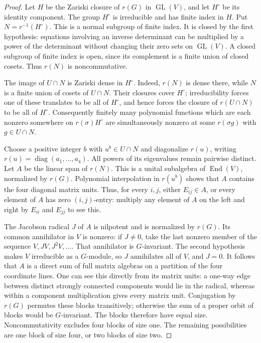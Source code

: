\documentclass[11pt,a4paper]{article}
\theoremstyle{remark}
\begin{document}
\begin{proof}
Let $H$ be the Zariski closure of $r(G)$ in $\operatorname{GL}(V)$,
and let $H^\circ$ be its identity component. The group $H^\circ$ is
irreducible and has finite index in $H$. Put
$N=r^{-1}(H^\circ)$. This is a normal subgroup of finite index.
It is closed by the first hypothesis: equations involving an inverse
determinant can be multiplied by a power of the determinant without
changing their zero sets on $\operatorname{GL}(V)$. A closed subgroup
of finite index is open, since its complement is a finite union of
closed cosets. Thus $r(N)$ is noncommutative.

The image of $U\cap N$ is Zariski dense in $H^\circ$.
Indeed, $r(N)$ is dense there, while $N$ is a finite union of cosets
of $U\cap N$. Their closures cover $H^\circ$; irreducibility forces
one of these translates to be all of $H^\circ$, and hence forces
the closure of $r(U\cap N)$ to be all of $H^\circ$.
Consequently finitely many polynomial functions which are each
nonzero somewhere on $r(\sigma)H^\circ$ are simultaneously nonzero
at some $r(\sigma g)$ with $g\in U\cap N$.

Choose a positive integer $b$ with $u^b\in U\cap N$ and diagonalize
$r(u)$, writing $r(u)=\operatorname{diag}(a_1,\ldots,a_4)$.
All powers of its eigenvalues remain pairwise distinct.
Let $A$ be the linear span of $r(N)$. This is a unital subalgebra of
$\operatorname{End}(V)$, normalized by $r(G)$. Polynomial interpolation
in $r(u^b)$ shows that $A$ contains the four diagonal matrix units.
Thus, for every $i,j$, either $E_{ij}\in A$, or every element of $A$
has zero $(i,j)$-entry: multiply any element of $A$ on the left and
right by $E_{ii}$ and $E_{jj}$ to see this.

The Jacobson radical $J$ of $A$ is nilpotent and is normalized by
$r(G)$. Its common annihilator in $V$ is nonzero: if $J\ne0$, take
the last nonzero member of the sequence $V,JV,J^2V,\ldots$.
That annihilator is $G$-invariant. The second hypothesis makes $V$
irreducible as a $G$-module, so $J$ annihilates all of $V$, and $J=0$.
It follows that $A$ is a direct sum of full matrix algebras on a
partition of the four coordinate lines. One can see this directly
from its matrix units: a one-way edge between distinct strongly
connected components would lie in the radical, whereas within a
component multiplication gives every matrix unit.
Conjugation by $r(G)$ permutes these blocks transitively; otherwise
the sum of a proper orbit of blocks would be $G$-invariant.
The blocks therefore have equal size. Noncommutativity excludes
four blocks of size one. The remaining possibilities are one block
of size four, or two blocks of size two.


\end{proof}
\end{document}
